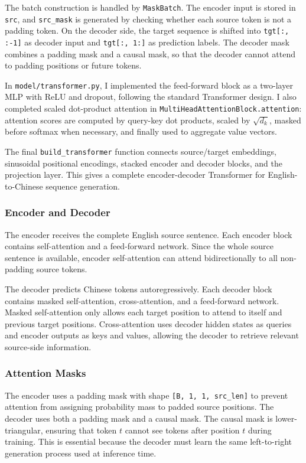 \documentclass[a4paper,12pt]{article}
\begin{document}
The batch construction is handled by \texttt{MaskBatch}. The encoder input is stored in \texttt{src}, and \texttt{src\_mask} is generated by checking whether each source token is not a padding token. On the decoder side, the target sequence is shifted into \texttt{tgt[:, :-1]} as decoder input and \texttt{tgt[:, 1:]} as prediction labels. The decoder mask combines a padding mask and a causal mask, so that the decoder cannot attend to padding positions or future tokens.

In \texttt{model/transformer.py}, I implemented the feed-forward block as a two-layer MLP with ReLU and dropout, following the standard Transformer design. I also completed scaled dot-product attention in \texttt{MultiHeadAttentionBlock.attention}: attention scores are computed by query-key dot products, scaled by $\sqrt{d_k}$, masked before softmax when necessary, and finally used to aggregate value vectors.

The final \texttt{build\_transformer} function connects source/target embeddings, sinusoidal positional encodings, stacked encoder and decoder blocks, and the projection layer. This gives a complete encoder-decoder Transformer for English-to-Chinese sequence generation.

\subsubsection{Encoder and Decoder}

The encoder receives the complete English source sentence. Each encoder block contains self-attention and a feed-forward network. Since the whole source sentence is available, encoder self-attention can attend bidirectionally to all non-padding source tokens.

The decoder predicts Chinese tokens autoregressively. Each decoder block contains masked self-attention, cross-attention, and a feed-forward network. Masked self-attention only allows each target position to attend to itself and previous target positions. Cross-attention uses decoder hidden states as queries and encoder outputs as keys and values, allowing the decoder to retrieve relevant source-side information.

\subsubsection{Attention Masks}

The encoder uses a padding mask with shape \texttt{[B, 1, 1, src\_len]} to prevent attention from assigning probability mass to padded source positions. The decoder uses both a padding mask and a causal mask. The causal mask is lower-triangular, ensuring that token $t$ cannot see tokens after position $t$ during training. This is essential because the decoder must learn the same left-to-right generation process used at inference time.
\end{document}
